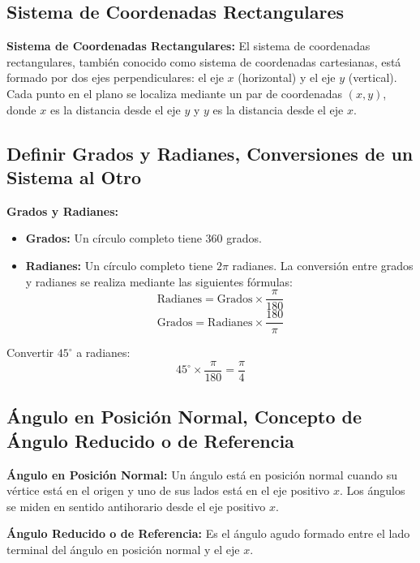 \subsection{Sistema de Coordenadas Rectangulares}

\begin{definition}
    \textbf{Sistema de Coordenadas Rectangulares:} El sistema de coordenadas rectangulares, también conocido como sistema de coordenadas cartesianas, está formado por dos ejes perpendiculares: el eje \(x\) (horizontal) y el eje \(y\) (vertical). Cada punto en el plano se localiza mediante un par de coordenadas \((x, y)\), donde \(x\) es la distancia desde el eje \(y\) y \(y\) es la distancia desde el eje \(x\).
\end{definition}

\subsection{Definir Grados y Radianes, Conversiones de un Sistema al Otro}

\begin{definition}
    \textbf{Grados y Radianes:} 
    \begin{itemize}
        \item \textbf{Grados:} Un círculo completo tiene 360 grados.
        \item \textbf{Radianes:} Un círculo completo tiene \(2\pi\) radianes. La conversión entre grados y radianes se realiza mediante las siguientes fórmulas:
        \[
        \text{Radianes} = \text{Grados} \times \frac{\pi}{180}
        \]
        \[
        \text{Grados} = \text{Radianes} \times \frac{180}{\pi}
        \]
    \end{itemize}
\end{definition}

\begin{example}
    Convertir \(45^\circ\) a radianes:
    \[
    45^\circ \times \frac{\pi}{180} = \frac{\pi}{4}
    \]
\end{example}

\subsection{Ángulo en Posición Normal, Concepto de Ángulo Reducido o de Referencia}

\begin{definition}
    \textbf{Ángulo en Posición Normal:} Un ángulo está en posición normal cuando su vértice está en el origen y uno de sus lados está en el eje positivo \(x\). Los ángulos se miden en sentido antihorario desde el eje positivo \(x\).
    
    \textbf{Ángulo Reducido o de Referencia:} Es el ángulo agudo formado entre el lado terminal del ángulo en posición normal y el eje \(x\).
\end{definition}

